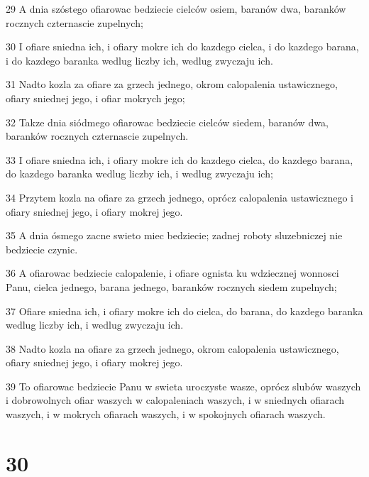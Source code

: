\par 29 A dnia szóstego ofiarowac bedziecie cielców osiem, baranów dwa, baranków rocznych czternascie zupelnych;
\par 30 I ofiare sniedna ich, i ofiary mokre ich do kazdego cielca, i do kazdego barana, i do kazdego baranka wedlug liczby ich, wedlug zwyczaju ich.
\par 31 Nadto kozla za ofiare za grzech jednego, okrom calopalenia ustawicznego, ofiary sniednej jego, i ofiar mokrych jego;
\par 32 Takze dnia siódmego ofiarowac bedziecie cielców siedem, baranów dwa, baranków rocznych czternascie zupelnych.
\par 33 I ofiare sniedna ich, i ofiary mokre ich do kazdego cielca, do kazdego barana, do kazdego baranka wedlug liczby ich, i wedlug zwyczaju ich;
\par 34 Przytem kozla na ofiare za grzech jednego, oprócz calopalenia ustawicznego i ofiary sniednej jego, i ofiary mokrej jego.
\par 35 A dnia ósmego zacne swieto miec bedziecie; zadnej roboty sluzebniczej nie bedziecie czynic.
\par 36 A ofiarowac bedziecie calopalenie, i ofiare ognista ku wdziecznej wonnosci Panu, cielca jednego, barana jednego, baranków rocznych siedem zupelnych;
\par 37 Ofiare sniedna ich, i ofiary mokre ich do cielca, do barana, do kazdego baranka wedlug liczby ich, i wedlug zwyczaju ich.
\par 38 Nadto kozla na ofiare za grzech jednego, okrom calopalenia ustawicznego, ofiary sniednej jego, i ofiary mokrej jego.
\par 39 To ofiarowac bedziecie Panu w swieta uroczyste wasze, oprócz slubów waszych i dobrowolnych ofiar waszych w calopaleniach waszych, i w sniednych ofiarach waszych, i w mokrych ofiarach waszych, i w spokojnych ofiarach waszych.

\chapter{30}

